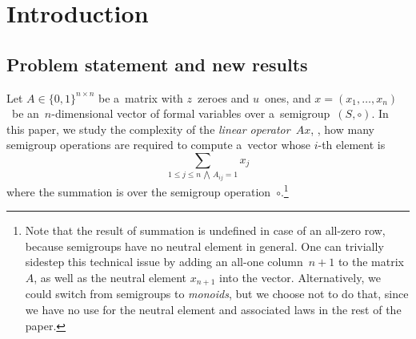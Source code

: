 \documentclass{toc}
\begin{document}
\section{Introduction}
\subsection{Problem statement and new results}
%
%

Let $A \in \{0,1\}^{n \times n}$ be a~matrix with $z$~zeroes and $u$~ones, and
$x=(x_1, \dotsc, x_n)$~be an~$n$-dimensional vector of formal variables over
a~semigroup~$(S, \circ)$. In this paper, we study the complexity of the
\emph{linear operator}~$Ax$, \ie, how many semigroup operations are required to
compute a~vector whose $i$-th element is
\begin{equation}\label{eq-problem-statement}
\sum_{1 \le j \le n\,\bigwedge\,A_{ij}=1}x_j
\end{equation}
where the summation is over the semigroup operation~$\circ$.\footnote{Note that
the result of summation is undefined in case of an all-zero row, because
semigroups have no neutral element in general. One can trivially sidestep this
technical issue by adding an all-one column~$n+1$ to the matrix~$A$, as well as
the neutral element $x_{n+1}$ into the vector. Alternatively, we could switch
from semigroups to \emph{monoids}, but we choose not to do that, since we have
no use for the neutral element and associated laws in the rest of the paper.}
\end{document}
